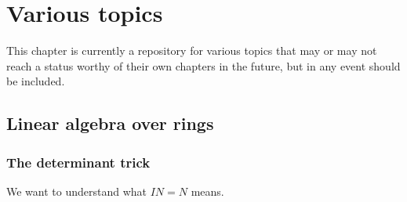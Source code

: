 \chapter{Various topics}

This chapter is currently a repository for various topics that may or may not
reach a status worthy of their own chapters in the future, but in any event
should be included.

\section{Linear algebra over rings}

\subsection{The determinant trick}
We want to understand what $IN=N$ means.

